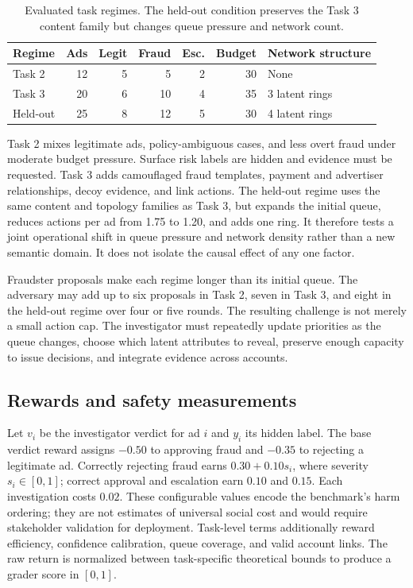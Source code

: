 \documentclass{article}
\begin{document}
\begin{table}[t]
\centering
\caption{Evaluated task regimes. The held-out condition preserves the Task 3 content family but changes queue pressure and network count.}
\label{tab:tasks}
\small
\begin{tabular}{lrrrrrl}
\toprule
Regime & Ads & Legit & Fraud & Esc. & Budget & Network structure \\
\midrule
Task 2 & 12 & 5 & 5 & 2 & 30 & None \\
Task 3 & 20 & 6 & 10 & 4 & 35 & 3 latent rings \\
Held-out & 25 & 8 & 12 & 5 & 30 & 4 latent rings \\
\bottomrule
\end{tabular}
\end{table}

Task 2 mixes legitimate ads, policy-ambiguous cases, and less overt fraud under moderate budget pressure. Surface risk labels are hidden and evidence must be requested. Task 3 adds camouflaged fraud templates, payment and advertiser relationships, decoy evidence, and link actions. The held-out regime uses the same content and topology families as Task 3, but expands the initial queue, reduces actions per ad from 1.75 to 1.20, and adds one ring. It therefore tests a joint operational shift in queue pressure and network density rather than a new semantic domain. It does not isolate the causal effect of any one factor.

Fraudster proposals make each regime longer than its initial queue. The adversary may add up to six proposals in Task 2, seven in Task 3, and eight in the held-out regime over four or five rounds. The resulting challenge is not merely a small action cap. The investigator must repeatedly update priorities as the queue changes, choose which latent attributes to reveal, preserve enough capacity to issue decisions, and integrate evidence across accounts.

\subsection{Rewards and safety measurements}

Let $v_i$ be the investigator verdict for ad $i$ and $y_i$ its hidden label. The base verdict reward assigns $-0.50$ to approving fraud and $-0.35$ to rejecting a legitimate ad. Correctly rejecting fraud earns $0.30+0.10s_i$, where severity $s_i\in[0,1]$; correct approval and escalation earn $0.10$ and $0.15$. Each investigation costs $0.02$. These configurable values encode the benchmark's harm ordering; they are not estimates of universal social cost and would require stakeholder validation for deployment. Task-level terms additionally reward efficiency, confidence calibration, queue coverage, and valid account links. The raw return is normalized between task-specific theoretical bounds to produce a grader score in $[0,1]$.
\end{document}
